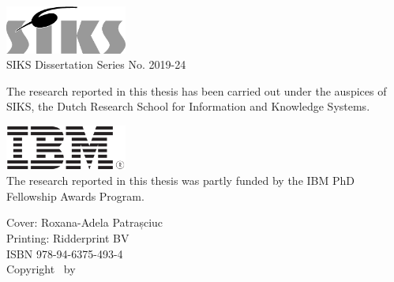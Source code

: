 \thispagestyle{empty}

\begin{addmargin}[-3cm]{1cm}
\vfill

\includegraphics[width=4cm]{front_back_matter/imgs/siks_zw.eps}\\
SIKS Dissertation Series No. 2019-24\bigskip
  

\noindent The research reported in this thesis has been carried out under the auspices of SIKS, the Dutch Research School for Information and Knowledge Systems.\bigskip\bigskip

\noindent \includegraphics[width=4cm]{front_back_matter/imgs/ibm.png}\\
The research reported in this thesis was partly funded by the IBM PhD Fellowship Awards Program.\bigskip\bigskip


\vfill
\noindent Cover: Roxana-Adela Patrașciuc \\
Printing: Ridderprint BV \\

\noindent ISBN 978-94-6375-493-4 \\

\noindent Copyright \textcopyright\ \myTime by \myName
\end{addmargin}